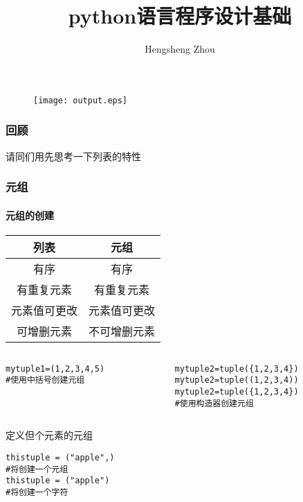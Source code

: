 \documentclass{beamer}
\title{python语言程序设计基础}
\author{Hengsheng Zhou}
\institute{电信与智能制造学院}
\begin{document}
\begin{frame}[t]
	\titlepage
	\begin{figure}
		\begin{center}
			\texttt{[image: output.eps]}
		\end{center}
	\end{figure}


\end{frame}
\begin{frame}[h]
\frametitle{回顾}
请同们用先思考一下列表的特性

\end{frame}
\begin{frame}[fragile]
	\frametitle{元组}
\framesubtitle{元组的创建}
\begin{table}[htpb]
\centering
\label{tab:label}
\begin{tabular}{|c|c|}
\hline
列表 & 元组 \\
\hline
有序   & 有序    \\
\hline
有重复元素  & 有重复元素  \\
\hline
元素值可更改 & 元素值可更改 \\
\hline
可增删元素  & 不可增删元素 \\
\hline
\end{tabular}
\end{table}
\pause
\begin{columns}
	\begin{column}{0.5\textwidth}
\begin{verbatim}
mytuple1=(1,2,3,4,5)
#使用中括号创建元组
\end{verbatim}
	\end{column}
	\begin{column}{0.5\textwidth}
\begin{verbatim}
mytuple2=tuple({1,2,3,4})
mytuple2=tuple((1,2,3,4))
mytuple2=tuple({1,2,3,4})
#使用构造器创建元组
\end{verbatim}	
	\end{column}
\end{columns}

\pause
\begin{alertblock}{定义但个元素的元组}
\begin{verbatim}
thistuple = ("apple",)
#将创建一个元组
thistuple = ("apple")
#将创建一个字符
\end{verbatim}
\end{alertblock}
\end{frame}
\end{document}
